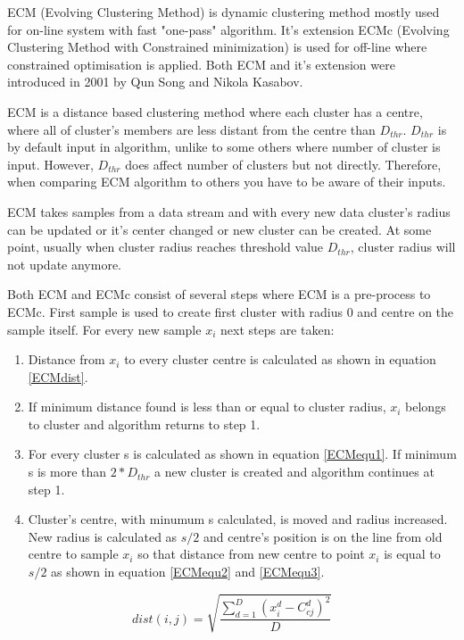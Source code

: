 \documentclass[conference]{IEEEtran}
\begin{document}
ECM (Evolving Clustering Method) is dynamic clustering method mostly used for on-line system with fast "one-pass" algorithm. It's extension ECMc (Evolving Clustering Method with Constrained minimization) is used for off-line where constrained optimisation is applied. Both ECM and it's extension were introduced in 2001 by Qun Song and Nikola Kasabov.

ECM is a distance based clustering method where each cluster has a centre, where all of cluster's members are less distant from the centre than $D_{thr}$. $D_{thr}$ is by default input in algorithm, unlike to some others where number of cluster is input. However, $D_{thr}$ does affect number of clusters but not directly. Therefore, when comparing ECM algorithm to others you have to be aware of their inputs.

ECM takes samples from a data stream and with every new data cluster's radius can be updated or it's center changed or new cluster can be created. At some point, usually when cluster radius reaches threshold value $D_{thr}$, cluster radius will not update anymore.

Both ECM and ECMc consist of several steps where ECM is a pre-process to ECMc. First sample is used to create first cluster with radius 0 and centre on the sample itself. For every new sample $x_i$ next steps are taken:
\begin{enumerate}
\item Distance from $x_i$ to every cluster centre is calculated as shown in equation \ref{ECMdist}.
\item If minimum distance found is less than or equal to cluster radius, $x_i$ belongs to cluster and algorithm returns to step 1.
\item For every cluster s is calculated as shown in equation \ref{ECMequ1}. If minimum s is more than $2*D_{thr}$ a new cluster is created and algorithm continues at step 1.
\item Cluster's centre, with minumum s calculated, is moved and radius increased. New radius is calculated as $s/2$ and centre's position is on the line from old centre to sample $x_i$ so that distance from new centre to point $x_i$ is equal to $s/2$ as shown in equation \ref{ECMequ2} and \ref{ECMequ3}.
\end{enumerate}

\begin{equation}\label{ECMdist}
dist(i,j) = \sqrt{ \frac {\sum_{d=1}^{D} (x_i^d - C_{cj}^d)^2} {D}}
\end{equation}
\end{document}
